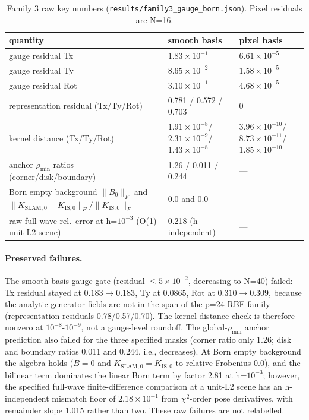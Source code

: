 \documentclass[12pt]{article}
\begin{document}
\begin{table}[ht]
\centering
\small
\caption{Family 3 raw key numbers
(\texttt{results/family3\_gauge\_born.json}). Pixel residuals are N=16.}
\label{tab:f3}
\begin{tabular}{p{} p{} p{}}
\toprule
quantity & smooth basis & pixel basis \\
\midrule
gauge residual Tx & $1.83\times10^{-1}$ & $6.61\times10^{-5}$ \\
gauge residual Ty & $8.65\times10^{-2}$ & $1.58\times10^{-5}$ \\
gauge residual Rot & $3.10\times10^{-1}$ & $4.68\times10^{-5}$ \\
representation residual (Tx/Ty/Rot) &
0.781 / 0.572 / 0.703 & 0 \\
kernel distance (Tx/Ty/Rot) &
$1.91\times10^{-8}$/$2.31\times10^{-9}$/$1.43\times10^{-8}$ &
$3.96\times10^{-10}$/$8.73\times10^{-11}$/$1.85\times10^{-10}$ \\
anchor $\rho_{\min}$ ratios (corner/disk/boundary) &
1.26 / 0.011 / 0.244 & --- \\
Born empty background $\|B_0\|_F$ and
$\|K_{\mathrm{SLAM},0}-K_{\mathrm{IS},0}\|_F/\|K_{\mathrm{IS},0}\|_F$ &
0.0 and 0.0 & --- \\
raw full-wave rel.\ error at h=$10^{-3}$ (O(1) unit-L2 scene) &
0.218 (h-independent) & --- \\
\bottomrule
\end{tabular}
\end{table}

\paragraph{Preserved failures.} The smooth-basis gauge gate
(residual $\le5\times10^{-2}$, decreasing to N=40) failed: Tx residual stayed
at $0.183\to0.183$, Ty at $0.0865$, Rot at $0.310\to0.309$, because the
analytic generator fields are not in the span of the p=24 RBF family
(representation residuals 0.78/0.57/0.70). The kernel-distance check is
therefore nonzero at $10^{-8}$-$10^{-9}$, not a gauge-level roundoff. The
global-$\rho_{\min}$ anchor prediction also failed for the three specified
masks (corner ratio only 1.26; disk and boundary ratios 0.011 and 0.244,
i.e., decreases). At Born empty background the algebra holds ($B=0$ and
$K_{\mathrm{SLAM},0}=K_{\mathrm{IS},0}$ to relative Frobenius 0.0), and the
bilinear term dominates the linear Born term by factor 2.81 at h=$10^{-3}$;
however, the specified full-wave finite-difference comparison at a unit-L2
scene has an h-independent mismatch floor of $2.18\times10^{-1}$ from
$\chi^2$-order pose derivatives, with remainder slope 1.015 rather than two.
These raw failures are not relabelled.
\end{document}
